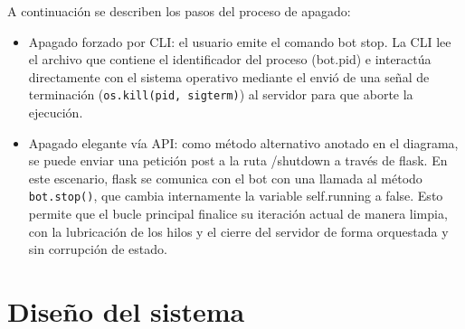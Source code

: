 A continuación se describen los pasos del proceso de apagado:

\begin{itemize}
\item  Apagado forzado por CLI: el usuario emite el comando bot stop. La CLI lee el archivo que contiene el identificador del proceso (bot.pid) e interactúa directamente con el sistema operativo mediante el envió de una señal de terminación (\texttt{os.kill(pid, sigterm)}) al servidor para que aborte la ejecución.

\item  Apagado elegante vía API: como método alternativo anotado en el diagrama, se puede enviar una petición post a la ruta /shutdown a través de flask. En este escenario, flask se comunica con el bot con una llamada al método \texttt{bot.stop()}, que cambia internamente la variable self.running a false. Esto permite que el bucle principal finalice su iteración actual de manera limpia, con la lubricación de los hilos y el cierre del servidor de forma orquestada y sin corrupción de estado.
\end{itemize}

\section{Diseño del sistema}

